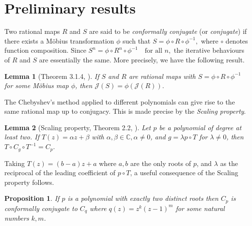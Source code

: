 \documentclass[12pt]{article}
\newtheorem{lem}{Lemma}[section]
\newtheorem{prop}{Proposition}[section]
\begin{document}
  
\section{Preliminary results}
\label{prelim}
Two rational maps $R$ and $S$ are said to be \emph{conformally conjugate} (or \emph{conjugate}) if there exists a Möbius transformation $\phi$ such that
 $ S = \phi \circ R \circ \phi^{-1}, $ 
where $\circ$ denotes function composition. Since
 $ S^n = \phi \circ R^n \circ \phi^{-1} \quad \text{for all } n,$ 
the iterative behaviours of $R$ and $S$ are essentially the same. More precisely, we have the following result.

\begin{lem}[Theorem 3.1.4, \cite{Beardon_book}]
	If $S$ and $R$ are rational maps with $S = \phi \circ R \circ \phi^{-1}$ for some Möbius map $\phi$, then
$\mathcal{J}(S) = \phi(\mathcal{J}(R)).$
\label{conjugacy}
\end{lem}
The Chebyshev's method applied to different polynomials can give rise to the same rational map up to conjugacy. This is made precise by the \emph{Scaling property}.

\begin{lem}[Scaling property, Theorem 2.2, \cite{Nayak-Pal2022}]\label{scaling}
	Let $p$ be a polynomial of degree at least two. If $T(z) = \alpha z + \beta$ with $\alpha, \beta \in \mathbb{C}, \alpha \neq 0$, and $g = \lambda p \circ T$ for $\lambda \neq 0$, then 
$T \circ C_g \circ T^{-1} = C_p.
$
\end{lem}
Taking $T(z)=(b-a)z+a$ where $a,b$ are the only roots of $p$, and $\lambda$ as the reciprocal of the leading coefficient of $p \circ T$, a useful consequence of the Scaling property  follows. 
\begin{prop}If $p$ is a polynomial with exactly two distinct roots then $C_p$ is conformally conjugate to $C_q$ where $q(z)=z^k (z-1)^m$ for some natural numbers $k,m$.
\label{scaling-tworoots}	\end{prop}
\end{document}
